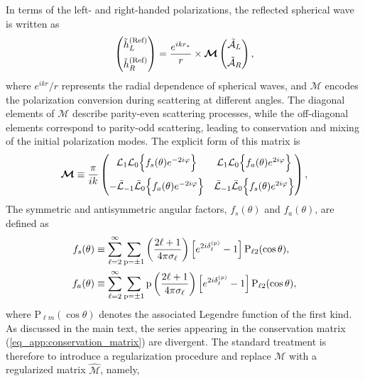 \documentclass[reprint,amsmath,amssymb,aps,prd]{revtex4-2}
\begin{document}
\begin{widetext}
In terms of the left- and right-handed polarizations, the reflected spherical wave is written as
\begin{equation}
\left(\begin{array}{@{}c@{}}
\tilde{h}_{L}^{\rm(Ref)}\\[6pt]
\tilde{h}_{R}^{\rm(Ref)}
\end{array}\right)
=\frac{e^{ikr_{*}}}{r}\times\bm{\mathcal{M}}
\left(\begin{array}{@{}c@{}}
\tilde{\mathcal{A}}_L\\[6pt]
\tilde{\mathcal{A}}_R
\end{array}\right),
\end{equation}
where $e^{ikr{}}/r$ represents the radial dependence of spherical waves, and $\bm{\mathcal{M}}$ encodes the polarization conversion during scattering at different angles. The diagonal elements of $\bm{\mathcal{M}}$ describe parity-even scattering processes, while the off-diagonal elements correspond to parity-odd scattering, leading to conservation and mixing of the initial polarization modes. The explicit form of this matrix is
\begin{equation}
\label{eq_app:conservation_matrix}
\bm{\mathcal{M}}
\equiv\frac{\pi}{ik}
\left(\begin{array}{@{}cc@{}}
\mathcal{L}_{1}\mathcal{L}_0\Big\{f_{s}(\theta)e^{-2i\varphi}\Big\} &
\mathcal{L}_{1}\mathcal{L}_0\Big\{f_{a}(\theta)e^{2i\varphi}\Big\}\\[9pt]
-\bar{\mathcal{L}}_{-1}\bar{\mathcal{L}}_0\Big\{f_{a}(\theta)e^{-2i\varphi}\Big\}&
\bar{\mathcal{L}}_{-1}\bar{\mathcal{L}}_0\Big\{f_{s}(\theta)e^{2i\varphi}\Big\}
\end{array}\right),
\end{equation}
The symmetric and antisymmetric angular factors, $f_{s}(\theta)$ and $f_{a}(\theta)$, are defined as
\begin{subequations}
\label{eq_app:partial_wave_series}
\begin{align}
f_{s}(\theta)&\equiv\sum_{\ell=2}^{\infty}\sum_{\mathrm{p}=\pm1}\left(\frac{2\ell+1}{4\pi\sigma_{\ell}}\right)\left[e^{2i\delta_{\ell}^{\rm(p)}}-1\right]\mathrm{P}_{\ell2}(\cos\theta),\\
f_{a}(\theta)&\equiv\sum_{\ell=2}^{\infty}\sum_{\mathrm{p}=\pm1}\mathrm{p}\left(\frac{2\ell+1}{4\pi\sigma_{\ell}}\right)\left[e^{2i\delta_{\ell}^{\rm(p)}}-1\right]\mathrm{P}_{\ell2}(\cos\theta),
\end{align}
\end{subequations}
where $\mathrm{P}_{\ell m}(\cos\theta)$ denotes the associated Legendre function of the first kind. As discussed in the main text, the series appearing in the conservation matrix (\ref{eq_app:conservation_matrix}) are divergent. The standard treatment is therefore to introduce a regularization procedure and replace $\bm{\mathcal{M}}$ with a regularized matrix $\widehat{\bm{\mathcal{M}}}$, namely,

\end{widetext}
\end{document}
